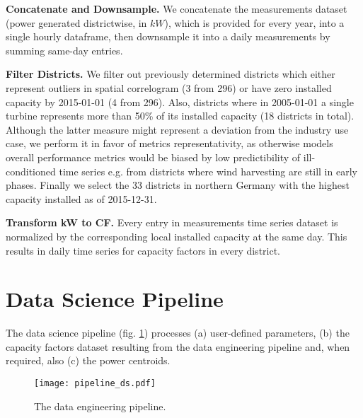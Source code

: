 \vspace{1em}
\noindent
\textbf{Concatenate and Downsample.}  We concatenate the measurements dataset (power generated districtwise, in $kW$), which is provided for every year, into a single hourly dataframe, then downsample it into a daily measurements by summing same-day entries.

\vspace{1em}
\noindent
\textbf{Filter Districts.}   We filter out previously determined districts  which either represent outliers in spatial correlogram (3 from 296) or have zero installed capacity by 2015-01-01 (4 from 296).
Also, districts where in 2005-01-01 a single turbine represents more than 50\% of its installed capacity (18 districts in total).
Although the latter measure might represent a deviation from the industry use case, we perform it in favor of metrics representativity, as otherwise models overall performance metrics would be biased by low predictibility of ill-conditioned time series e.g. from districts where wind harvesting are still in early phases.
Finally we select the 33 districts in northern Germany with the highest capacity installed as of 2015-12-31.

\vspace{1em}
\noindent
\textbf{Transform kW to CF.}  Every entry in measurements time series dataset is normalized by the corresponding local installed capacity at the same day.
This results in daily time series for capacity factors in every district.

\pagebreak

\section{Data Science Pipeline}
The data science pipeline (fig. \ref{fig:pipeline_ds}) processes (a) user-defined parameters, (b) the capacity factors dataset resulting from the data engineering pipeline and, when required, also (c) the power centroids.

\begin{figure}[H]
	\centering
    \caption{The data engineering pipeline.}
    \texttt{[image: pipeline\_ds.pdf]}
	\label{fig:pipeline_ds}
\end{figure}

\pagebreak

